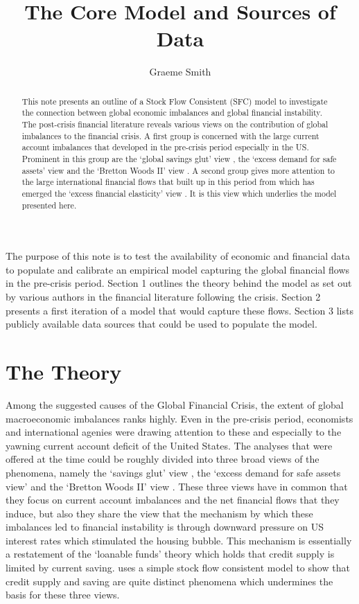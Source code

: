 \documentclass[twoside,a4paper,11pt]{article}
\title{The Core Model and Sources of Data}
\author{Graeme Smith}
\begin{document}
\maketitle
\begin{abstract} This note presents an outline of a Stock Flow Consistent (SFC) model to investigate the connection between global economic imbalances and global financial instability. The post-crisis financial literature reveals various views on the contribution of global imbalances to the financial crisis. A first group is concerned with the large current account imbalances that developed in the pre-crisis period especially in the US. Prominent in this group are the `global savings glut' view \cite{Bernanke2005},  the ‘excess demand for safe assets’ view \cite{Caballero2006} and the ‘Bretton Woods II’ view \cite{Dooley2003}. A second group gives more attention to the large international financial flows that built up in this period from which has emerged the `excess financial elasticity' view \cite{Borio2011b}. It is this view which underlies the model presented here.
\end{abstract}

The purpose of this note is to test the availability of economic and financial data to populate and calibrate an empirical model capturing the global financial flows in the pre-crisis period. Section 1 outlines the theory behind the model as set out by various authors in the financial literature following the crisis. Section 2 presents a first iteration of a model that would capture these flows. Section 3 lists publicly available data sources that could be used to populate the model.

\section{The Theory}
Among the suggested causes of the Global Financial Crisis, the extent of global macroeconomic imbalances ranks highly. Even in the pre-crisis period, economists and international agenies were drawing attention to these and especially to the yawning current account deficit of the United States. The analyses that were offered at the time could be roughly divided into three broad views of the phenomena, namely the `savings glut' view \cite{Bernanke2005},  the `excess demand for safe assets view' \cite{Caballero2006} and the `Bretton Woods II' view \cite{Dooley2003}. These three views have in common that they focus on current account imbalances and the net financial flows that they induce, but also they share the view that the mechanism by which these imbalances led to financial instability is through downward pressure on US interest rates which stimulated the housing bubble. This mechanism is essentially a restatement of the `loanable funds' theory which holds that credit supply is limited by current saving. \cite{Lindner2015} uses a simple stock flow consistent model to show that credit supply and saving are quite distinct phenomena which undermines the basis for these three views.
\end{document}
